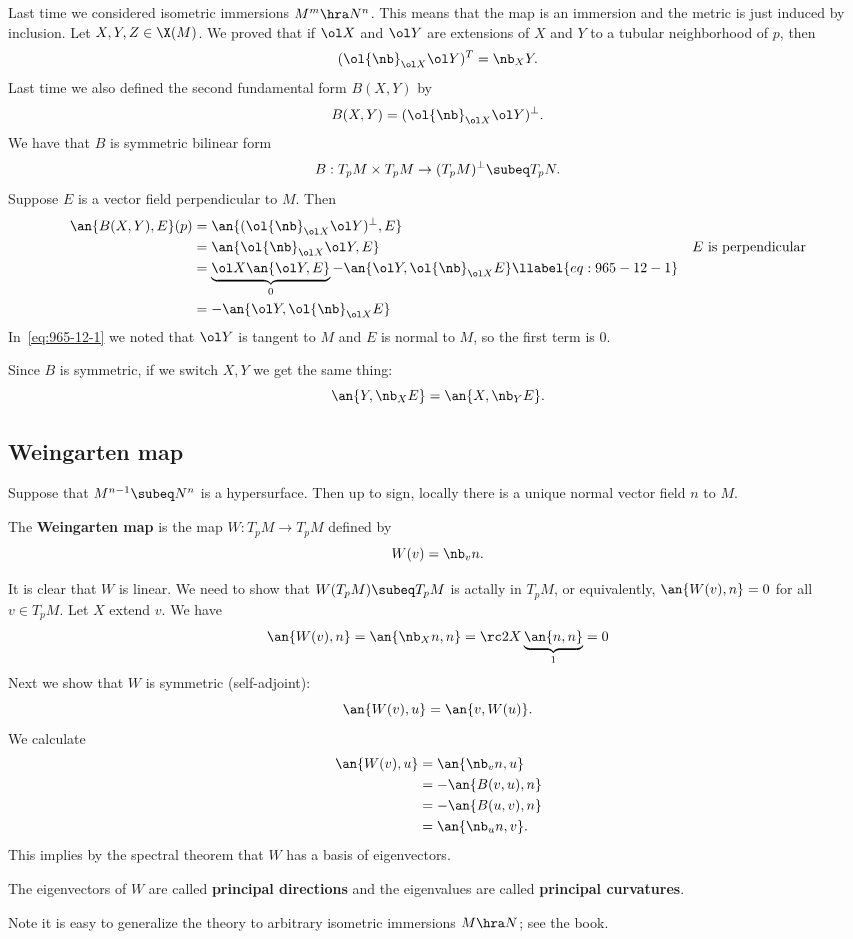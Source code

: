 
Last time we considered isometric immersions $M^m\hra N^n$. This means that the map is an immersion and the metric is just induced by inclusion. Let $X,Y,Z\in \X(M)$. We proved that if $\ol X$ and $\ol Y$ are extensions of $X$ and $Y$ to a tubular neighborhood of $p$, then 
\[
(\ol{\nb}_{\ol X}\ol Y)^T=\nb_X Y.
\]
Last time we also defined the second fundamental form $B(X,Y)$ by
\[
B(X,Y)=(\ol{\nb}_{\ol X} \ol Y)^{\perp}.
\]
We have that $B$ is symmetric bilinear form
\[
B:T_pM\times T_pM\to (T_pM)^{\perp}\subeq T_p N.
\]
Suppose $E$ is a vector field perpendicular to $M$. Then 
\begin{align}
\nonumber
\an{B(X,Y),E}(p)&=\an{(\ol{\nb}_{\ol X}\ol Y)^{\perp},E}\\
\nonumber
&=\an{\ol{\nb}_{\ol X}\ol Y,E}&%
E\text{ is perpendicular}\\
&=\underbrace{\ol X\an{\ol Y,E}}_0-\an{\ol Y,\ol{\nb}_{\ol X}E}\llabel{eq:965-12-1}\\
\nonumber
&=-\an{\ol Y,\ol{\nb}_{\ol X}E}
\end{align}
In~\eqref{eq:965-12-1} we noted that $\ol Y$ is tangent to $M$ and $E$ is normal to $M$, so the first term is 0.

Since $B$ is symmetric, if we switch $X,Y$ we get the same thing:
\[
\an{Y,\nb_XE}=\an{X,\nb_YE}.
\]

\subsection{Weingarten map}
Suppose that $M^{n-1}\subeq N^n$ is a hypersurface. Then up to sign, locally there is a unique normal vector field $n$ to $M$. 
\begin{df}
The \textbf{Weingarten map} is the map $W:T_pM\to T_pM$ defined by
\[
W(v)=\nb_v n.
\]
\end{df}
It is clear that $W$ is linear. We need to show that $W(T_pM)\subeq T_pM$ is actally in $T_pM$, or equivalently, $\an{W(v),n}=0$ for all $v\in T_pM$. Let $X$ extend $v$. We have 
\[
\an{W(v),n}=\an{\nb_X n,n}=\rc 2X\underbrace{\an{n,n}}_1=0
\]
Next we show that $W$ is symmetric (self-adjoint):
\[
\an{W(v),u}=\an{v,W(u)}.
\]
We calculate
\begin{align*}
\an{W(v),u}&= \an{\nb_v n, u}\\
&=-\an{B(v,u),n}\\
&=-\an{B(u,v),n}\\%
&=\an{\nb_un,v}.
\end{align*}
This implies by the spectral theorem that $W$ has a basis of eigenvectors.
\begin{df}
The eigenvectors of $W$ are called \textbf{principal directions} and the eigenvalues are called \textbf{principal curvatures}.
\end{df}
Note it is easy to generalize the theory to arbitrary isometric immersions $M\hra N$; see the book.

